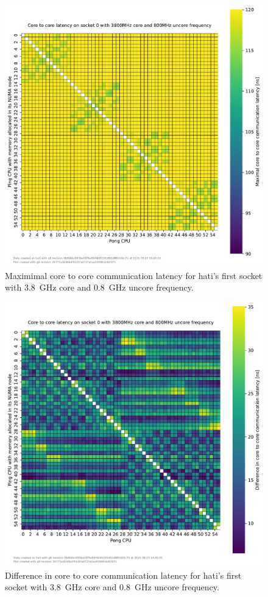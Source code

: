 \begin{figure}[]
    \centering
    \includegraphics[width=\columnwidth]{fig/core-to-core-latency/core-to-core-heatmap-max-3800-800.pdf}
    \caption{Maximimal core to core communication latency for hati's first socket with \SI{3.8}{\GHz} core and \SI{0.8}{\GHz} uncore frequency.}
\end{figure}
\begin{figure}[]
    \centering
    \includegraphics[width=\columnwidth]{fig/core-to-core-latency/core-to-core-heatmap-diff-3800-800.pdf}
    \caption{Difference in core to core communication latency for hati's first socket with \SI{3.8}{\GHz} core and \SI{0.8}{\GHz} uncore frequency.}
\end{figure}

